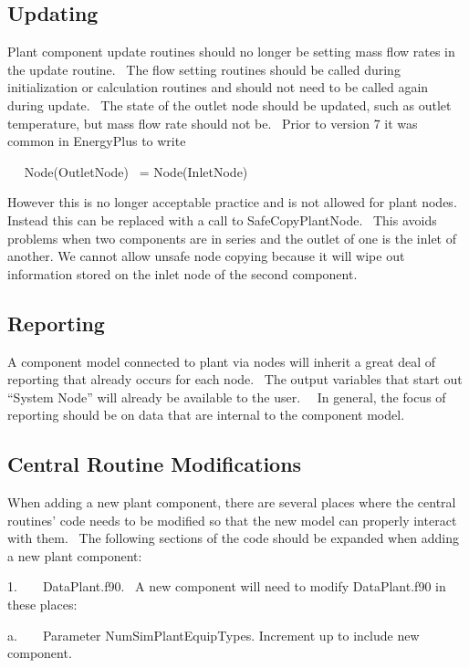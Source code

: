 \subsection{Updating}\label{updating}

Plant component update routines should no longer be setting mass flow rates in the update routine.~ The flow setting routines should be called during initialization or calculation routines and should not need to be called again during update.~ The state of the outlet node should be updated, such as outlet temperature, but mass flow rate should not be.~ Prior to version 7 it was common in EnergyPlus to write

~~ Node(OutletNode)~ = Node(InletNode)

However this is no longer acceptable practice and is not allowed for plant nodes.~ Instead this can be replaced with a call to SafeCopyPlantNode.~ This avoids problems when two components are in series and the outlet of one is the inlet of another. We cannot allow unsafe node copying because it will wipe out information stored on the inlet node of the second component.

\subsection{Reporting}\label{reporting}

A component model connected to plant via nodes will inherit a great deal of reporting that already occurs for each node.~ The output variables that start out ``System Node'' will already be available to the user.~~ In general, the focus of reporting should be on data that are internal to the component model.

\subsection{Central Routine Modifications}\label{central-routine-modifications}

When adding a new plant component, there are several places where the central routines' code needs to be modified so that the new model can properly interact with them.~ The following sections of the code should be expanded when adding a new plant component:

1.~~~~DataPlant.f90.~ A new component will need to modify DataPlant.f90 in these places:

a.~~~~Parameter NumSimPlantEquipTypes. Increment up to include new component.

